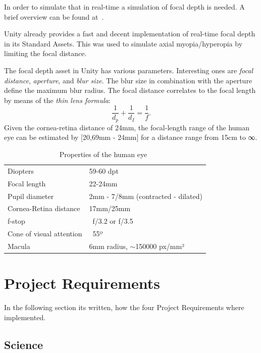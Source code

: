 \documentclass{sig-alternate-05-2015}
\begin{document}
In order to simulate that in real-time a simulation of focal depth is needed.
A brief overview can be found at~\cite{gpugems-DoF}.

Unity already provides a fast and decent implementation of real-time focal depth in its Standard Assets.
This was used to simulate axial myopia/hyperopia by limiting the focal distance.

The focal depth asset in Unity has various parameters. Interesting ones are \emph{focal distance}, \emph{aperture}, and \emph{blur size}.
The blur size in combination with the aperture define the maximum blur radius.
The focal distance correlates to the focal length by means of the \emph{thin lens formula}:
\begin{equation}
    \frac{1}{d_p} + \frac{1}{d_I} = \frac{1}{f}.
\end{equation}
Given the cornea-retina distance of 24mm, the focal-length range of the human eye can be estimated by [20,69mm - 24mm] for a distance range from 15cm to ∞.
%
\begin{table}
    \centering
    \begin{tabular}{ll}
        Diopters                & 59-60 dpt \\
        Focal length            & 22-24mm\\
        Pupil diameter          & 2mm - 7/8mm (contracted - dilated) \\
        Cornea-Retina distance  & 17mm/25mm \\
        f-stop                  & ~f/3.2 or f/3.5 \\
        Cone of visual attention& ~55º \\
        Macula                  & 6mm radius, $\sim$150000 px/mm²\\
    \end{tabular}
    \caption{Properties of the human eye~\cite{eye-focal, eyeascamera}}
    \label{tab:eyeproperties}
\end{table}


\section{Project Requirements}

In the following section its written, how the four Project Requirements where implemented.

\subsection{Science}
\end{document}
